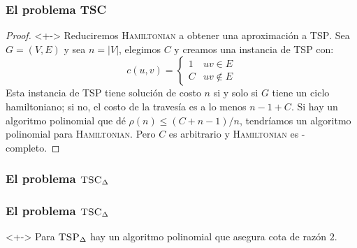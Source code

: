 \documentclass[english, spanish, fleqn,%
hyperref = {colorlinks, urlcolor = blue}%
]{beamer}
\begin{document}
\begin{frame}
  \setcounter{beamerpauses}{2}
  \frametitle{El problema \textsc{TSC}}

  \begin{proof}<+->
    Reduciremos \textsc{Hamiltonian}
    a obtener una aproximación a \textsc{TSP}.
    Sea \(G = (V, E)\)
    y sea \(n = \lvert V \rvert\),
    elegimos \(C\) y creamos una instancia de \textsc{TSP}
    con:
    \begin{equation*}
      c(u, v)
        = \begin{cases}
            1 & u v \in E \\
            C & u v \notin E
          \end{cases}
    \end{equation*}
    Esta instancia de \textsc{TSP}
    tiene solución de costo \(n\)
    si y solo si \(G\) tiene un ciclo hamiltoniano;
    si no,
    el costo de la travesía es a lo menos \(n - 1 + C\).
    Si hay un algoritmo polinomial
    que dé \(\rho(n) \le (C + n - 1) / n\),
    tendríamos un algoritmo polinomial para \textsc{Hamiltonian}.
    Pero \(C\) es arbitrario
    y \textsc{Hamiltonian} es \NP\nobreakdash-completo.
  \end{proof}
\end{frame}

\begin{frame}
  \setcounter{beamerpauses}{2}
  \frametitle{El problema \(\text{\textsc{TSC}}_\Delta\)}

\end{frame}

\begin{frame}
  \setcounter{beamerpauses}{2}
  \frametitle{El problema \(\text{\textsc{TSC}}_\Delta\)}

  \begin{theorem}<+->
    Para \(\textsc{TSP}_\Delta\)
    hay un algoritmo polinomial que asegura cota de razón \(2\).
  \end{theorem}
\end{frame}
\end{document}
